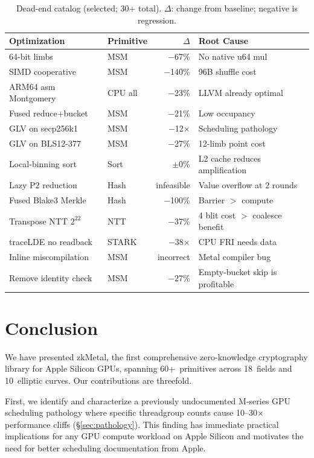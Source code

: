 \begin{table}[t]
\centering
\small
\caption{Dead-end catalog (selected; 30+ total). $\Delta$: change from baseline; negative is regression.}
\label{tab:dead-ends}
\begin{tabular}{p{2.8cm}p{1.3cm}rp{2.2cm}}
\toprule
Optimization & Primitive & $\Delta$ & Root Cause \\
\midrule
64-bit limbs & MSM & $-$67\% & No native u64 mul \\
SIMD cooperative & MSM & $-$140\% & 96B shuffle cost \\
ARM64 asm Montgomery & CPU all & $-$23\% & LLVM already optimal \\
Fused reduce+bucket & MSM & $-$21\% & Low occupancy \\
GLV on secp256k1 & MSM & $-$12$\times$ & Scheduling pathology \\
GLV on BLS12-377 & MSM & $-$27\% & 12-limb point cost \\
Local-binning sort & Sort & $\pm$0\% & L2 cache reduces amplification \\
Lazy P2 reduction & Hash & infeasible & Value overflow at 2 rounds \\
Fused Blake3 Merkle & Hash & $-$100\% & Barrier $>$ compute \\
Transpose NTT $2^{22}$ & NTT & $-$37\% & 4 blit cost $>$ coalesce benefit \\
traceLDE no readback & STARK & $-$38$\times$ & CPU FRI needs data \\
Inline miscompilation & MSM & incorrect & Metal compiler bug \\
Remove identity check & MSM & $-$27\% & Empty-bucket skip is profitable \\
\bottomrule
\end{tabular}
\end{table}



\section{Conclusion}
\label{sec:conclusion}

We have presented zkMetal, the first comprehensive zero-knowledge cryptography library for Apple Silicon GPUs, spanning 60+~primitives across 18~fields and 10~elliptic curves.
Our contributions are threefold.

First, we identify and characterize a previously undocumented M-series GPU scheduling pathology where specific threadgroup counts cause 10--30$\times$ performance cliffs (\S\ref{sec:pathology}).
This finding has immediate practical implications for any GPU compute workload on Apple Silicon and motivates the need for better scheduling documentation from Apple.

